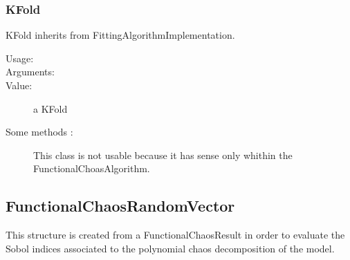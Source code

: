 \subsubsection{KFold}
KFold inherits from FittingAlgorithmImplementation.

\begin{description}
\item[Usage:] \strut
{}

\item[Arguments:]  \strut
{}

\item[Value:] a KFold

\item[Some methods :]  This class is not usable because it has sense only whithin the FunctionalChoasAlgorithm.

\end{description}





\newpage
\subsection{FunctionalChaosRandomVector}

This structure is created from a FunctionalChaosResult in order to evaluate the Sobol indices associated to the polynomial chaos decomposition of the model.

